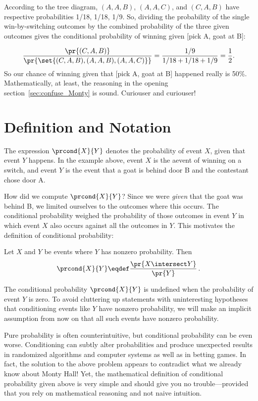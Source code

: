 According to the tree diagram, $(A, A, B)$, $(A, A, C)$, and $(C, A,
B)$ have respective probabilities 1/18, 1/18, 1/9.  So, dividing the
probability of the single win-by-switching outcomes by the combined
probability of the three given outcomes gives the conditional
probability of winning given [pick A, goat at B]:
\iffalse A Monty Hall game has a
\[
\frac{1}{18} + \frac{1}{18} + \frac{1}{9} = \frac{2}{9}
\]
chance of ending in one of these outcomes.  This 2/9 fraction is all
we need; we can ignore all other outcomes on the tree.
\fi
\[ 
\frac{\pr{(C, A, B)}}{\pr{\set{(C, A, B),(A, A,
    B),(A, A, C)}}} = \frac{1/9}{1/18 + 1/18 + 1/9}=\frac{1}{2}.
\]
So our chance of winning given that [pick A, goat at B] happened
really is 50\%.  Mathematically, at least, the reasoning in the
opening section~\ref{sec:confuse_Monty} is sound.  Curiouser and
curiouser!

\section{Definition and Notation}

The expression $\prcond{X}{Y}$ denotes the probability of event $X$,
given that event $Y$ happens.  In the example above, event $X$ is the
aevent of winning on a switch, and event $Y$ is the event that a goat
is behind door B and the contestant chose door A.

How did we compute $\prcond{X}{Y}$?  Since we were \emph{given} that
the goat was behind B, we limited ourselves to the outcomes where this
occurs.  The conditional probability weighed the probability of those
outcomes in event $Y$ in which event $X$ also occurs against all the
outcomes in $Y$.  This motivates the definition of conditional
probability:
\begin{definition}\label{LN12:prcond}
Let $X$ and $Y$ be events where $Y$ has nonzero probability.  Then
\[
\prcond{X}{Y} \eqdef \frac{\pr{X \intersect Y}}{\pr{Y}}\,.
\]
\end{definition}

The conditional probability $\prcond{X}{Y}$ is undefined when the
probability of event $Y$ is zero.  To avoid cluttering up statements
with uninteresting hypotheses that conditioning events like $Y$ have
nonzero probability, we will make an implicit assumption from now on
that all such events have nonzero probability.

Pure probability is often counterintuitive, but conditional
probability can be even worse.  Conditioning can subtly alter
probabilities and produce unexpected results in randomized algorithms
and computer systems as well as in betting games.  In fact, the
solution to the above problem appears to contradict what we already
know about Monty Hall!  Yet, the mathematical definition of
conditional probability given above is very simple and should give you
no trouble---provided that you rely on mathematical reasoning and not
naive intuition.


